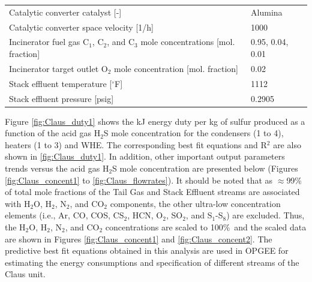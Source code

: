 \documentclass[11pt]{report}
\begin{document}
\begin{table}
\begin{scriptsize}
\begin{tabular*}{1\columnwidth}{p{}p{}}
Catalytic converter catalyst {[}-{]}                 &              Alumina \\
Catalytic converter space velocity {[}1/h{]}                     &      1000    \\
Incinerator fuel gas C$_1$, C$_2$, and C$_3$ mole concentrations {[}mol. fraction{]}         &        0.95, 0.04, 0.01    \\
Incinerator target outlet O$_2$ mole concentration {[}mol. fraction{]}                 &      0.02    \\
Stack effluent temperature {[}$^\circ$F{]}                &       1112    \\
Stack effluent pressure {[}psig{]}                        &        0.2905     \\
\bottomrule
\end{tabular*}
\end{scriptsize}
\end{table}

Figure \ref{fig:Claus_duty1} shows the kJ energy duty per kg of sulfur produced as a function of the acid gas H$_2$S mole concentration for the condensers (1 to 4), heaters (1 to 3) and WHE. The corresponding best fit equations and R$^2$ are also shown in \ref{fig:Claus_duty1}. In addition, other important output parameters trends versus the acid gas H$_2$S mole concentration are presented below (Figures \ref{fig:Claus_concent1} to \ref{fig:Claus_flowrates}). It should be noted that as $\approx$99\% of total mole fractions of the Tail Gas and Stack Effluent streams are associated with H$_2$O, H$_2$, N$_2$, and CO$_2$ components, the other ultra-low concentration elements (i.e., Ar, CO, COS, CS$_2$, HCN, O$_2$, SO$_2$, and S$_1$-S$_8$) are excluded. Thus, the H$_2$O, H$_2$, N$_2$, and CO$_2$ concentrations are scaled to 100\%\, and the scaled data are shown in Figures \ref{fig:Claus_concent1} and \ref{fig:Claus_concent2}. The predictive best fit equations obtained in this analysis are used in OPGEE for estimating the energy consumptions and specification of different streams of the Claus unit.         
\end{document}
